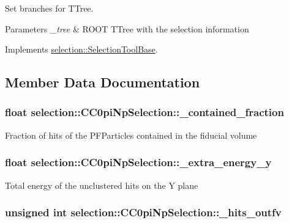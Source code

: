 Set branches for T\-Tree. 


\begin{DoxyParams}{Parameters}
{\em \-\_\-tree} & R\-O\-O\-T T\-Tree with the selection information \\
\hline
\end{DoxyParams}


Implements \hyperlink{classselection_1_1SelectionToolBase_aa97ea5e55391240d8e251dae13897996}{selection\-::\-Selection\-Tool\-Base}.



\subsection{Member Data Documentation}
\hypertarget{classselection_1_1CC0piNpSelection_a8e7933222bce1424aee24bae8dcf4864}{
\subsubsection[{\-\_\-contained\-\_\-fraction}]{\setlength{\rightskip}{0pt plus 5cm}float selection\-::\-C\-C0pi\-Np\-Selection\-::\-\_\-contained\-\_\-fraction\hspace{0.3cm}{\ttfamily [private]}}}\label{classselection_1_1CC0piNpSelection_a8e7933222bce1424aee24bae8dcf4864}
Fraction of hits of the P\-F\-Particles contained in the fiducial volume \hypertarget{classselection_1_1CC0piNpSelection_a2e386c361ecc27d22ff2642e80a629e4}{
\subsubsection[{\-\_\-extra\-\_\-energy\-\_\-y}]{\setlength{\rightskip}{0pt plus 5cm}float selection\-::\-C\-C0pi\-Np\-Selection\-::\-\_\-extra\-\_\-energy\-\_\-y\hspace{0.3cm}{\ttfamily [private]}}}\label{classselection_1_1CC0piNpSelection_a2e386c361ecc27d22ff2642e80a629e4}
Total energy of the unclustered hits on the Y plane \hypertarget{classselection_1_1CC0piNpSelection_ac39ec79d190fb925f8d20b03cbeb0605}{
\subsubsection[{\-\_\-hits\-\_\-outfv}]{\setlength{\rightskip}{0pt plus 5cm}unsigned int selection\-::\-C\-C0pi\-Np\-Selection\-::\-\_\-hits\-\_\-outfv\hspace{0.3cm}{\ttfamily [private]}}}\label{classselection_1_1CC0piNpSelection_ac39ec79d190fb925f8d20b03cbeb0605}
